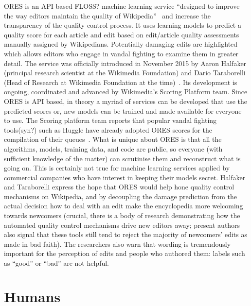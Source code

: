 ORES is an API based FLOSS? machine learning service ``designed to improve the way editors maintain the quality of Wikipedia''~\cite{HalTar2015} and increase the transparency of the quality control process.
It uses learning models to predict a quality score for each article and edit based on edit/article quality assessments manually assigned by Wikipedians.
Potentially damaging edits are highlighted which allows editors who engage in vandal fighting to examine them in greater detail.
The service was officially introduced in November 2015 by Aaron Halfaker (principal research scientist at the Wikimedia Foundation) and Dario Taraborelli (Head of Research at Wikimedia Foundation at the time)~\cite{HalTar2015}. %
Its development is ongoing, coordinated and advanced by Wikimedia's Scoring Platform team.
Since ORES is API based, in theory a myriad of services can be developed that use the predicted scores or, new models can be trained and made available for everyone to use.
The Scoring platform team reports that popular vandal fighting tools(syn?) such as Huggle have already adopted ORES scores for the compilation of their queues~\cite{HalTar2015}.
What is unique about ORES is that all the algorithms, models, training data, and code are public, so everyone (with sufficient knowledge of the matter) can scrutinise them and reconstruct what is going on.
This is certainly not true for machine learning services applied by commercial companies who have interest in keeping their models secret.
Halfaker and Taraborelli express the hope that ORES would help hone quality control mechanisms on Wikipedia, and by decoupling the damage prediction from the actual decision how to deal with an edit make the encyclopedia more welcoming towards newcomers
(crucial, there is a body of research demonstrating how the automated quality control mechanisms drive new editors away; present authors also signal that these tools still tend to reject the majority of newcomers' edits as made in bad faith).
The researchers also warn that wording is tremendously important for the perception of edits and people who authored them: labels such as ``good'' or ``bad'' are not helpful.

\section{Humans}

